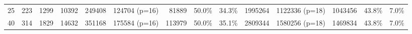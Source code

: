 \begin{table*}[p]
\begin{tabular}{rrrr|rrrrr|rrrrr}
    25 & 223 & 1299 & 10392 & 249408 & 124704 (p=16) & 81889 & 50.0\%& 34.3\%& 1995264 & 1122336 (p=18)& 1043456 & 43.8\%& 7.0\% \\
    
    40 & 314 & 1829& 14632& 351168& 175584 (p=16)& 113979& 50.0\%& 35.1\%& 2809344& 1580256 (p=18)& 1469834& 43.8\%& 7.0\% \\
    
    \bottomrule
  \end{tabular}
\end{table*}